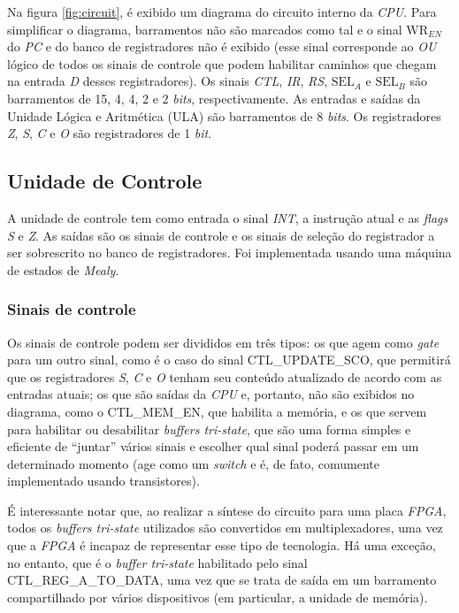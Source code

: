 \documentclass[a4paper,12pt]{report}
\begin{document}
Na figura \ref{fig:circuit}, é exibido um diagrama do circuito interno da \textit{CPU}.
Para simplificar o diagrama, barramentos não são marcados como tal e o sinal
$\textrm{WR}_{EN}$ do \textit{PC} e do banco de registradores não é exibido (esse sinal 
corresponde ao \textit{OU} lógico de todos os sinais de controle que podem habilitar 
caminhos que chegam na entrada \textit{D} desses registradores). Os sinais 
\textit{CTL}, \textit{IR}, \textit{RS}, $\textrm{SEL}_A$ e $\textrm{SEL}_B$ são 
barramentos de 15, 4, 4, 2 e 2 \textit{bits}, respectivamente. As entradas e saídas da
Unidade Lógica e Aritmética (ULA) são barramentos de 8 \textit{bits}. Os registradores
\textit{Z}, \textit{S}, \textit{C} e \textit{O} são registradores de 1 \textit{bit}.

\subsection*{Unidade de Controle}

A unidade de controle tem como entrada o sinal \textit{INT}, a instrução atual e as 
\textit{flags} \textit{S} e \textit{Z}. As saídas são os sinais de controle e os sinais
de seleção do registrador a ser sobrescrito no banco de registradores. Foi implementada
usando uma máquina de estados de \textit{Mealy}.

\subsubsection*{Sinais de controle}

Os sinais de controle podem ser divididos em três tipos: os que agem como \textit{gate}
para um outro sinal, como é o caso do sinal {\footnotesize CTL\_UPDATE\_SCO}, que permitirá
que os registradores \textit{S}, \textit{C} e \textit{O} tenham seu conteúdo atualizado de
acordo com as entradas atuais; os que são saídas da \textit{CPU} e, portanto, não são 
exibidos no diagrama, como o {\footnotesize CTL\_MEM\_EN}, que habilita a memória, e os que 
servem para habilitar ou desabilitar \textit{buffers tri-state}, que são uma forma simples
e eficiente de ``juntar'' vários sinais e escolher qual sinal poderá passar em um 
determinado momento (age como um \textit{switch} e é, de fato, comumente implementado 
usando transistores).

É interessante notar que, ao realizar a síntese do circuito para uma placa \textit{FPGA},
todos os \textit{buffers tri-state} utilizados são convertidos em multiplexadores, uma vez 
que a \textit{FPGA} é incapaz de representar esse tipo de tecnologia. Há uma exceção, no
entanto, que é o \textit{buffer tri-state} habilitado pelo sinal 
{\footnotesize CTL\_REG\_A\_TO\_DATA}, uma vez que se trata de saída em um barramento
compartilhado por vários dispositivos (em particular, a unidade de memória).
\end{document}
